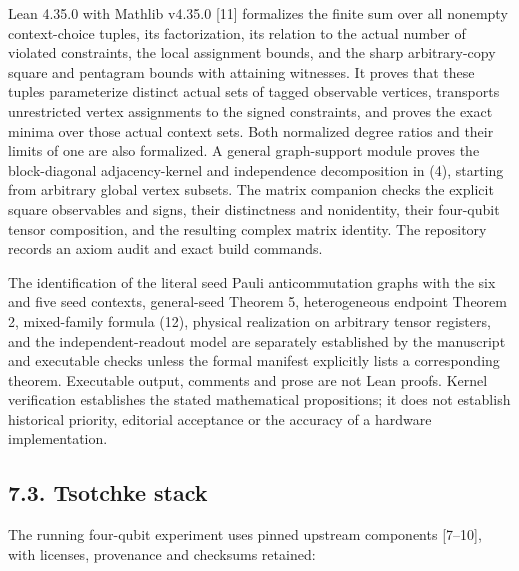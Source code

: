 \documentclass[10pt,a4paper]{article}
\begin{document}
Lean 4.35.0 with Mathlib v4.35.0 {[}11{]} formalizes the finite sum over all nonempty context-choice tuples, its factorization, its relation to the actual number of violated constraints, the local assignment bounds, and the sharp arbitrary-copy square and pentagram bounds with attaining witnesses. It proves that these tuples parameterize distinct actual sets of tagged observable vertices, transports unrestricted vertex assignments to the signed constraints, and proves the exact minima over those actual context sets. Both normalized degree ratios and their limits of one are also formalized. A general graph-support module proves the block-diagonal adjacency-kernel and independence decomposition in (4), starting from arbitrary global vertex subsets. The matrix companion checks the explicit square observables and signs, their distinctness and nonidentity, their four-qubit tensor composition, and the resulting complex matrix identity. The repository records an axiom audit and exact build commands.

The identification of the literal seed Pauli anticommutation graphs with the six and five seed contexts, general-seed Theorem 5, heterogeneous endpoint Theorem 2, mixed-family formula (12), physical realization on arbitrary tensor registers, and the independent-readout model are separately established by the manuscript and executable checks unless the formal manifest explicitly lists a corresponding theorem. Executable output, comments and prose are not Lean proofs. Kernel verification establishes the stated mathematical propositions; it does not establish historical priority, editorial acceptance or the accuracy of a hardware implementation.

\subsection{7.3. Tsotchke stack}\label{tsotchke-stack}

The running four-qubit experiment uses pinned upstream components {[}7--10{]}, with licenses, provenance and checksums retained:
\end{document}
